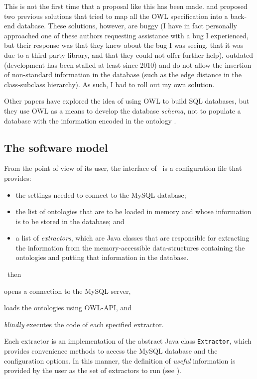 This is not the first time that a proposal like this has been made. \citet{Zhou2006} and \citet{Henss2009} proposed two previous solutions that tried to map all the OWL specification into a back-end database. These solutions, however, are buggy (I have in fact personally approached one of these authors requesting assistance with a bug I experienced, but their response was that they knew about the bug I was seeing, that it was due to a third party library, and that they could not offer further help), outdated (development has been stalled at least since 2010) and do not allow the insertion of non-standard information in the database (such as the edge distance in the class-subclass hierarchy). As such, I had to roll out my own solution.

Other papers have explored the idea of using OWL to build SQL databases, but they use OWL as a means to develop the database \emph{schema}, not to populate a database with the information encoded in the ontology \citep[\eg][]{Astrova2007,Zina2014}.


\subsection{The software model} \label{sub:owlsql/model}

From the point of view of its user, the interface of \owlsql\ is a configuration file that provides:
\begin{itemize}
    \item the settings needed to connect to the MySQL database;
    \item the list of ontologies that are to be loaded in memory and whose information is to be stored in the database; and
    \item a list of \emph{extractors}, which are Java classes that are responsible for extracting the information from the memory-accessible data-structures containing the ontologies and putting that information in the database.
\end{itemize}

\owlsql\ then
\begin{paralist}
    \item opens a connection to the MySQL server,
    \item loads the ontologies using OWL-API, and
    \item \emph{blindly} executes the code of each specified extractor.
\end{paralist}
Each extractor is an implementation of the abstract Java class \texttt{Extractor}, which provides convenience methods to access the MySQL database and the configuration options. In this manner, the definition of \emph{useful} information is provided by the user as the set of extractors to run (see ).

